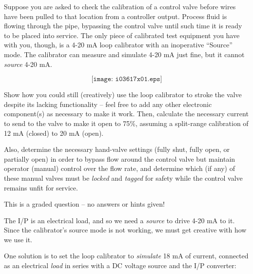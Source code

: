 

Suppose you are asked to check the calibration of a control valve before wires have been pulled to that location from a controller output.  Process fluid is flowing through the pipe, bypassing the control valve until such time it is ready to be placed into service.  The only piece of calibrated test equipment you have with you, though, is a 4-20 mA loop calibrator with an inoperative ``Source'' mode.  The calibrator can measure and simulate 4-20 mA just fine, but it cannot {\it source} 4-20 mA.

$$\texttt{[image: i03617x01.eps]}$$

Show how you could still (creatively) use the loop calibrator to stroke the valve despite its lacking functionality -- feel free to add any other electronic component(s) as necessary to make it work.  Then, calculate the necessary current to send to the valve to make it open to 75\%, assuming a split-range calibration of 12 mA (closed) to 20 mA (open).

\vskip 10pt

Also, determine the necessary hand-valve settings (fully shut, fully open, or partially open) in order to bypass flow around the control valve but maintain operator (manual) control over the flow rate, and determine which (if any) of these manual valves must be {\it locked} and {\it tagged} for safety while the control valve remains unfit for service.

\vfil

\eject






This is a graded question -- no answers or hints given!







The I/P is an electrical load, and so we need a {\it source} to drive 4-20 mA to it.  Since the calibrator's source mode is not working, we must get creative with how we use it. 

One solution is to set the loop calibrator to {\it simulate} 18 mA of current, connected as an electrical {\it load} in series with a DC voltage source and the I/P converter:

